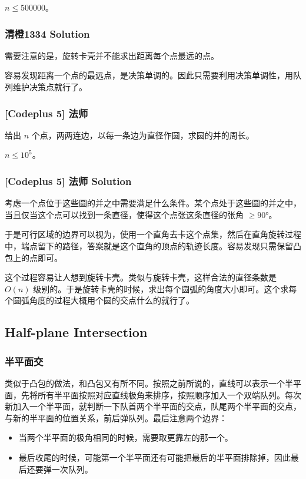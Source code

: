 \documentclass[10pt]{beamer}
\begin{document}
\begin{CJK}{UTF8}{gkai}
\begin{spacing}{1.2}
\begin{frame}
			$n \le 500000$。

		\end{frame}
		\begin{frame}
			\frametitle{清橙1334 Solution}

			需要注意的是，旋转卡壳并不能求出距离每个点最远的点。 \pause

			容易发现距离一个点的最远点，是决策单调的。因此只需要利用决策单调性，用队列维护决策点就行了。

		\end{frame}
		\begin{frame}
			\frametitle{[Codeplus 5] 法师}

			给出 $n$ 个点，两两连边，以每一条边为直径作圆，求圆的并的周长。

			$n \le 10^5$。

		\end{frame}
		\begin{frame}
			\frametitle{[Codeplus 5] 法师 Solution}

			考虑一个点位于这些圆的并之中需要满足什么条件。某个点处于这些圆的并之中，当且仅当这个点可以找到一条直径，使得这个点张这条直径的张角 $\ge 90$°。 \pause

			于是可行区域的边界可以视为，使用一个直角去卡这个点集，然后在直角旋转过程中，端点留下的路径，答案就是这个直角的顶点的轨迹长度。容易发现只需保留凸包上的点即可。 \pause

			这个过程容易让人想到旋转卡壳。类似与旋转卡壳，这样合法的直径条数是 $O(n)$ 级别的。于是旋转卡壳的时候，求出每个圆弧的角度大小即可。这个求每个圆弧角度的过程大概用个圆的交点什么的就行了。

		\end{frame}
		\subsection{Half-plane Intersection}
		\begin{frame}
			\frametitle{半平面交}

			类似于凸包的做法，和凸包又有所不同。按照之前所说的，直线可以表示一个半平面，先将所有半平面按照对应直线极角来排序，按照顺序加入一个双端队列。每次新加入一个半平面，就判断一下队首两个半平面的交点，队尾两个半平面的交点，与新的半平面的位置关系，前后弹队列。最后注意两个边界： \pause
			\begin{itemize}
				\item 当两个半平面的极角相同的时候，需要取更靠左的那一个。 \pause
				\item 最后收尾的时候，可能第一个半平面还有可能把最后的半平面排除掉，因此最后还要弹一次队列。
			\end{itemize}


\end{frame}
\end{spacing}
\end{CJK}
\end{document}
